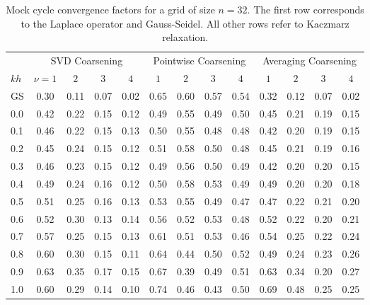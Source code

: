 \documentclass{article}
\begin{document}
\begin{table}
{\small
\begin{tabular}{l|cccc|cccc|cccc}
\toprule
& \multicolumn{4}{c|}{SVD Coarsening} & \multicolumn{4}{|c|}{Pointwise Coarsening} & \multicolumn{4}{|c}{Averaging Coarsening} \\
$kh$ &  $\nu=1$ &  $2$ &  $3$ &  $4$ &  $1$ &  $2$ &  $3$ &  $4$ &  $1$ &  $2$ &  $3$ &  $4$ \\
\midrule
GS &       0.30 &       0.11 &       0.07 &       0.02 &      0.65 &      0.60 &      0.57 &      0.54 &       0.32 &       0.12 &       0.07 &       0.02 \\
0.0   &       0.42 &       0.22 &       0.15 &       0.12 &      0.49 &      0.55 &      0.49 &      0.50 &       0.45 &       0.21 &       0.19 &       0.15 \\
0.1   &       0.46 &       0.22 &       0.15 &       0.13 &      0.50 &      0.55 &      0.48 &      0.48 &       0.42 &       0.20 &       0.19 &       0.15 \\
0.2   &       0.45 &       0.24 &       0.15 &       0.12 &      0.51 &      0.58 &      0.50 &      0.48 &       0.45 &       0.21 &       0.19 &       0.16 \\
0.3   &       0.46 &       0.23 &       0.15 &       0.12 &      0.49 &      0.56 &      0.50 &      0.49 &       0.42 &       0.20 &       0.20 &       0.15 \\
0.4   &       0.49 &       0.24 &       0.16 &       0.12 &      0.50 &      0.58 &      0.53 &      0.49 &       0.49 &       0.20 &       0.20 &       0.18 \\
0.5   &       0.51 &       0.25 &       0.16 &       0.13 &      0.53 &      0.55 &      0.49 &      0.47 &       0.47 &       0.22 &       0.21 &       0.20 \\
0.6   &       0.52 &       0.30 &       0.13 &       0.14 &      0.56 &      0.52 &      0.53 &      0.48 &       0.52 &       0.22 &       0.20 &       0.21 \\
0.7   &       0.57 &       0.25 &       0.15 &       0.13 &      0.61 &      0.51 &      0.53 &      0.46 &       0.54 &       0.25 &       0.22 &       0.24 \\
0.8   &       0.60 &       0.30 &       0.15 &       0.11 &      0.64 &      0.44 &      0.50 &      0.52 &       0.49 &       0.24 &       0.23 &       0.26 \\
0.9   &       0.63 &       0.35 &       0.17 &       0.15 &      0.67 &      0.39 &      0.49 &      0.51 &       0.63 &       0.34 &       0.20 &       0.27 \\
1.0   &       0.60 &       0.29 &       0.14 &       0.10 &      0.74 &      0.46 &      0.43 &      0.50 &       0.69 &       0.48 &       0.25 &       0.25 \\\bottomrule
\end{tabular}
}
\caption{Mock cycle convergence factors for a grid of size $n=32$. The first row corresponds to the Laplace operator and Gauss-Seidel. All other rows refer to Kaczmarz relaxation.}
\end{table}
\end{document}
